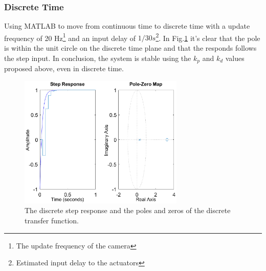 \subsubsection{Discrete Time}
Using MATLAB to move from continuous time to discrete time with a update frequency of 20 Hz\footnote{The update frequency of the camera} and an input delay of $1/30s$\footnote{Estimated input delay to the actuators}. In Fig.\ref{fig:stepD} it's clear that the pole is within the unit circle on the discrete time plane and that the responds follows the step input. In conclusion, the system is stable using the $k_p$ and $k_d$ values proposed above, even in discrete time.

\begin{figure}[H]
    \centering
    \includegraphics[width= 0.7\textwidth]{img/closed_loop_step_D.eps}
    \caption{The discrete step response and the poles and zeros of the discrete transfer function.}
    \label{fig:stepD}
\end{figure}
